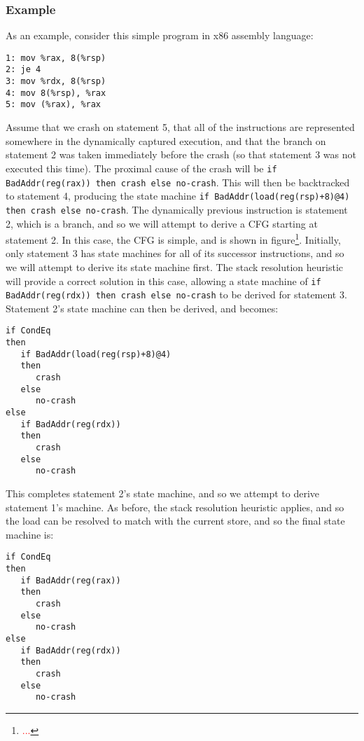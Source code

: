 \documentclass[10pt,twocolumn,preprint,natbib,authoryear]{sigplanconf}
\newcommand{\editorial}[1]{\textcolor{red}{\footnote{\textcolor{red}{#1}}}}
\begin{document}
\subsubsection{Example}

As an example, consider this simple program in x86 assembly language:

\begin{verbatim}
1: mov %rax, 8(%rsp)
2: je 4
3: mov %rdx, 8(%rsp)
4: mov 8(%rsp), %rax
5: mov (%rax), %rax
\end{verbatim}

Assume that we crash on statement 5, that all of the instructions are
represented somewhere in the dynamically captured execution, and that
the branch on statement 2 was taken immediately before the crash (so
that statement 3 was not executed this time).  The proximal cause of
the crash will be
\verb|if BadAddr(reg(rax)) then crash else no-crash|.  This will then
be backtracked to statement 4, producing the state machine
\verb|if BadAddr(load(reg(rsp)+8)@4) then crash else no-crash|.  The
dynamically previous instruction is statement 2, which is a branch,
and so we will attempt to derive a CFG starting at statement 2.  In
this case, the CFG is simple, and is shown in figure\editorial{...}.
Initially, only statement 3 has state machines for all of its
successor instructions, and so we will attempt to derive its state
machine first.  The stack resolution heuristic will provide a correct
solution in this case, allowing a state machine of
\verb|if BadAddr(reg(rdx)) then crash else no-crash| to be derived for
statement 3.  Statement 2's state machine can then be derived, and
becomes:

\begin{verbatim}
if CondEq
then
   if BadAddr(load(reg(rsp)+8)@4)
   then
      crash
   else
      no-crash
else
   if BadAddr(reg(rdx))
   then
      crash
   else
      no-crash
\end{verbatim}

This completes statement 2's state machine, and so we attempt to
derive statement 1's machine.  As before, the stack resolution
heuristic applies, and so the load can be resolved to match with
the current store, and so the final state machine is:

\begin{verbatim}
if CondEq
then
   if BadAddr(reg(rax))
   then
      crash
   else
      no-crash
else
   if BadAddr(reg(rdx))
   then
      crash
   else
      no-crash
\end{verbatim}
\end{document}
